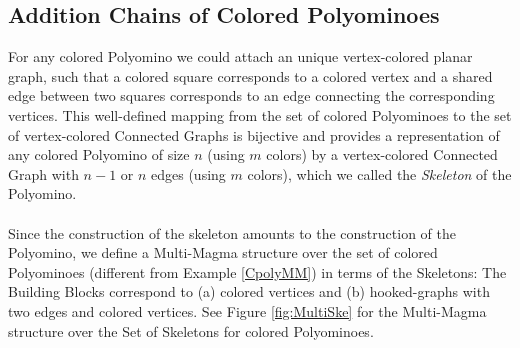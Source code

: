 \documentclass[letterpaper,12pt]{article}
\theoremstyle{definition}
\begin{document}
\subsection{Addition Chains of Colored Polyominoes}
For any colored Polyomino we could attach an unique vertex-colored planar graph, such that a colored square corresponds to a colored vertex and a shared edge between two squares corresponds to an edge connecting the corresponding vertices. This well-defined mapping from the set of colored Polyominoes to the set of vertex-colored Connected Graphs is bijective and provides a representation of any colored Polyomino of size $n$ (using $m$ colors) by a vertex-colored Connected Graph with $n-1$ or $n$ edges (using $m$ colors), which we called the \textit{Skeleton} of the Polyomino. \\\\
Since the construction of the skeleton amounts to the construction of the Polyomino, we define a Multi-Magma structure over the set of colored Polyominoes (different from Example \ref{CpolyMM}) in terms of the Skeletons: The Building Blocks correspond to (a) colored vertices and (b) hooked-graphs with two edges and colored vertices. See Figure \ref{fig:MultiSke} for the Multi-Magma structure over the Set of Skeletons for colored Polyominoes. 
\end{document}

